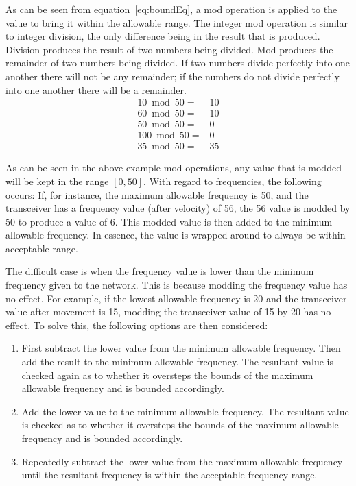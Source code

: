 As can be seen from equation~\ref{eq:boundEq}, a mod operation is applied to the value to bring it within the allowable range. The integer mod operation is similar to integer division, the only difference being in the result that is produced. Division produces the result of two numbers being divided. Mod produces the remainder of two numbers being divided. If two numbers divide perfectly into one another there will not be any remainder; if the numbers do not divide perfectly into one another there will be a remainder. 
\begin{align}
	10 \bmod 50 =& 10 \nonumber \\
	60 \bmod 50 =& 10 \nonumber \\
	50 \bmod 50 =& 0 \nonumber \\
	100 \bmod 50 =& 0 \nonumber \\
	35 \bmod 50 =& 35 \nonumber 
\end{align}

As can be seen in the above example mod operations, any value that is modded will be kept in the range $[0,50]$. With regard to frequencies, the following occurs: If, for instance, the maximum allowable frequency is 50, and the transceiver has a frequency value (after velocity) of 56, the 56 value is modded by 50 to produce a value of 6. This modded value is then added to the minimum allowable frequency. In essence, the value is wrapped around to always be within acceptable range. 

The difficult case is when the frequency value is lower than the minimum frequency given to the network. This is because modding the frequency value has no effect. For example, if the lowest allowable frequency is 20 and the transceiver value after movement is 15, modding the transceiver value of 15 by 20 has no effect. To solve this, the following options are then considered:

\begin{enumerate}
\item First subtract the lower value from the minimum allowable frequency. Then add the result to the minimum allowable frequency. The resultant value is checked again as to whether it oversteps the bounds of the maximum allowable frequency and is bounded accordingly.
\item Add the lower value to the minimum allowable frequency. The resultant value is checked as to whether it oversteps the bounds of the maximum allowable frequency and is bounded accordingly.
\item Repeatedly subtract the lower value from the maximum allowable frequency until the resultant frequency is within the acceptable frequency range.
\end{enumerate}

